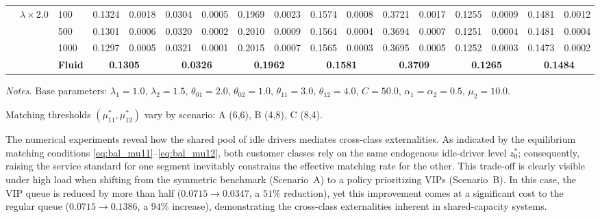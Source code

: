 \begin{table}[htbp]
\begin{threeparttable}
{\begin{tabular}{l|l|l|r@{\,$\pm$\,}l|r@{\,$\pm$\,}l|r@{\,$\pm$\,}l|r@{\,$\pm$\,}l|r@{\,$\pm$\,}l|r@{\,$\pm$\,}l|r@{\,$\pm$\,}l}
\cline{2-17}
 & \multirow{4}{*}{$\lambda \times 2.0$} & 100 & 0.1324 & 0.0018 & 0.0304 & 0.0005 & 0.1969 & 0.0023 & 0.1574 & 0.0008 & 0.3721 & 0.0017 & 0.1255 & 0.0009 & 0.1481 & 0.0012 \\ 
 & & 500 & 0.1301 & 0.0006 & 0.0320 & 0.0002 & 0.2010 & 0.0009 & 0.1564 & 0.0004 & 0.3694 & 0.0007 & 0.1251 & 0.0004 & 0.1481 & 0.0004 \\ 
 & & 1000 & 0.1297 & 0.0005 & 0.0321 & 0.0001 & 0.2015 & 0.0007 & 0.1565 & 0.0003 & 0.3695 & 0.0005 & 0.1252 & 0.0003 & 0.1473 & 0.0002 \\ 
 & & \textbf{Fluid} & \multicolumn{2}{c|}{\textbf{0.1305}} & \multicolumn{2}{c|}{\textbf{0.0326}} & \multicolumn{2}{c|}{\textbf{0.1962}} & \multicolumn{2}{c|}{\textbf{0.1581}} & \multicolumn{2}{c|}{\textbf{0.3709}} & \multicolumn{2}{c|}{\textbf{0.1265}} & \multicolumn{2}{c}{\textbf{0.1484}} \\ 
\hline
\end{tabular}%
}
\begin{tablenotes}[flushleft]
  \footnotesize
  \item \textit{Notes.} Base parameters: $\lambda_1=1.0$, $\lambda_2=1.5$, $\theta_{01}=2.0$, $\theta_{02}=1.0$, 
  $\theta_{11}=3.0$, $\theta_{12}=4.0$, $C=50.0$, $\alpha_1=\alpha_2=0.5$, $\mu_2=10.0$.
  \item Matching thresholds $(\mu_{11}^*, \mu_{12}^*)$ vary by scenario: A (6,6), B (4,8), C (8,4).
\end{tablenotes}
\end{threeparttable}
\end{table}

The numerical experiments reveal how the shared pool of idle drivers mediates cross-class externalities.
As indicated by the equilibrium matching conditions \eqref{eq:bal_mu11}--\eqref{eq:bal_mu12}, both customer classes rely on the same endogenous idle-driver level $z_0^*$; consequently, raising the service standard for one segment inevitably constrains the effective matching rate for the other.
This trade-off is clearly visible under high load when shifting from the symmetric benchmark (Scenario~A) to a policy prioritizing VIPs (Scenario~B).
In this case, the VIP queue is reduced by more than half ($0.0715\to 0.0347$, a $51\%$ reduction), yet this improvement comes at a significant cost to the regular queue ($0.0715\to 0.1386$, a $94\%$ increase), demonstrating the cross-class externalities inherent in shared-capacity systems.

